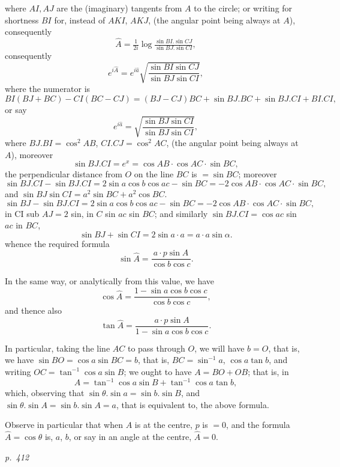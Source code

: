 \documentclass[11pt,a4paper]{article}
\theoremstyle{plain}
\theoremstyle{definition}
\begin{document}
\noindent
where $A I, A J$ are the (imaginary) tangents from $A$ to the circle; or writing for
shortness $B I$ for, instead of $A K I$, $A K J$, (the angular point being always at $A$),
consequently
\[
\hat{A} = \tfrac{1}{2 i} \log \tfrac{\sin BI. \sin CJ}{\sin BJ. \sin CI},
\]
consequently
\[
e^{i \hat{A}} = e^{i \hat{a}} \sqrt{\frac{\sin BI \sin CJ}{\sin BJ \sin CI}},
\]
where the numerator is
\[
B I (BJ + B C) - C I (BC - C J) = (BJ - C J) B C + \sin BJ.BC + \sin BJ.CI + B I.CI,
\]
or say
\[
e^{i \hat{a}} = \sqrt{\frac{\sin BJ \sin CI}{\sin BJ \sin CI}},
\]
where $B J. B I = \cos^2 A B$, $C I. C J = \cos^2 A C$, (the angular point being always at $A$), moreover
\[
\sin BJ.CI = e^x = \cos AB \cdot \cos AC \cdot \sin BC,
\]
the perpendicular distance from $O$ on the line $BC$ is $= \sin BC$; moreover
\[
\sin BJ.CI - \sin BJ.CI = 2 \sin a \cos b \cos a c - \sin BC = - 2 \cos AB \cdot \cos AC \cdot \sin BC,
\]
and $\sin BJ \sin CI = a^2 \sin BC + a^2 \cos BC$.
\[
\sin BJ - \sin BJ.CI = 2 \sin a \cos b \cos a c - \sin BC = - 2 \cos AB \cdot \cos AC \cdot \sin BC,
\]
in CI sub $AJ = 2$ sin, in $C$ sin $a c$ sin $BC$; and similarly $\sin BJ.CI = \cos a c$ sin $a c$ in $BC$,
\[
\sin BJ + \sin CI = 2 \sin a \cdot a = a \cdot a \sin \alpha.
\]
whence the required formula
\[
\sin \hat{A} = \frac{a \cdot p \sin A}{\cos b \cos c}.
\]

In the same way, or analytically from this value, we have
\[
\cos \hat{A} = \frac{1 - \sin a \cos b \cos c}{\cos b \cos c},
\]
and thence also
\[
\tan \hat{A} = \frac{a \cdot p \sin A}{1 - \sin a \cos b \cos c}.
\]

In particular, taking the line $A C$ to pass through $O$, we will have $b = O$, that is, we have $\sin B O = \cos a \sin BC = b$, that is, $B C = \sin^{-1} a$, $\cos a \tan b$, and writing
$O C = \tan^{-1} \cos a \sin B$; we ought to have $A = B O + O B$; that is, in
\[
A = \tan^{-1}\cos a \sin B + \tan^{-1} \cos a \tan b,
\]
which, observing that $\sin\theta. \sin a = \sin b. \sin B$, and $\sin \theta. \sin A = \sin b. \sin A = a$, that is
equivalent to, the above formula.

Observe in particular that when $A$ is at the centre, $p$ is $= 0$, and the formula
$\hat{A} = \cos \theta$ is, $a$, $b$, or say in an angle at the centre, $\hat{A} = 0$.

\clearpage

\bigskip
\textit{p.~412}
\smallskip
\end{document}
